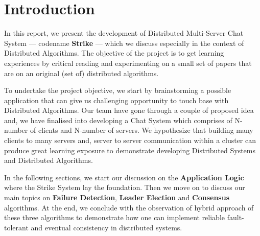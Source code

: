 \documentclass[dareport.tex]{subfiles}
\begin{document}

\section{Introduction}
In this report, we present the development of Distributed Multi-Server Chat System --- codename \textbf{Strike} --- which we discuss especially in the context of Distributed Algorithms. The objective of the project is to get learning experiences by critical reading and experimenting on a small set of papers that are on an original (set of) distributed algorithms.


To undertake the project objective, we start by brainstorming a possible application that can give us challenging opportunity to touch base with Distributed Algorithms. Our team have gone through a couple of proposed idea and, we have finalised into developing a Chat System which comprises of N-number of clients and N-number of servers. We hypothesize that building many clients to many servers and, server to server communication within a cluster can produce great learning exposure to demonstrate developing Distributed Systems and Distributed Algorithms. 


In the following sections, we start our discussion on the \textbf{Application Logic} where the Strike System lay the foundation. Then we move on to discuss our main topics on \textbf{Failure Detection}, \textbf{Leader Election} and \textbf{Consensus} algorithms. At the end, we conclude with the observation of hybrid approach of these three algorithms to demonstrate how one can implement reliable fault-tolerant and eventual consistency in distributed systems.
\end{document}
